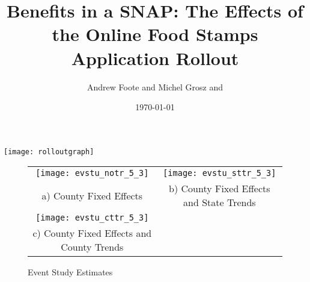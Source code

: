 \documentclass[11pt,letterpaper]{article}
\title{Benefits in a SNAP: The Effects of the Online Food Stamps Application Rollout}
\author{Andrew Foote and Michel Grosz and}
\date{\today\\  }
\begin{document}
\maketitle

\texttt{[image: rolloutgraph]}

\begin{figure}\caption{Event Study Estimates}
\begin{tabular}{cc}
\texttt{[image: evstu\_notr\_5\_3]}&\texttt{[image: evstu\_sttr\_5\_3]}\\
a) County Fixed Effects&b) County Fixed Effects and State Trends\\
\texttt{[image: evstu\_cttr\_5\_3]}\\c) County Fixed Effects and County Trends\\
\end{tabular}
\end{figure}
\end{document}
